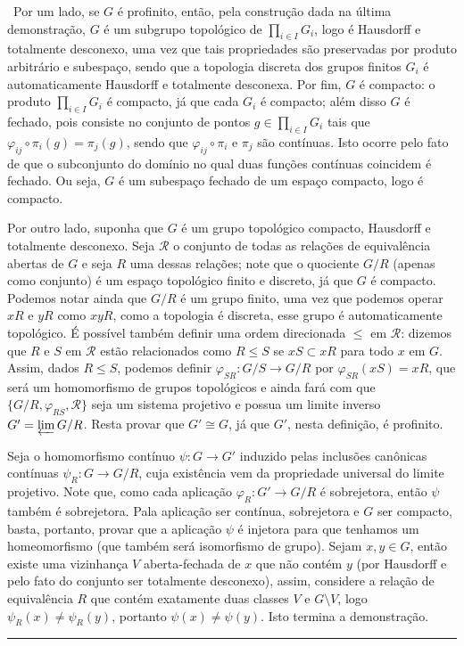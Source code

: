\documentclass[12pt,a4paper]{article}
\def\dem{\par\smallbreak\noindent {\textit{ Demonstração:}} \ }
\def\eop{\hfill\rule{2.5mm}{2.5mm} \\ }
\theoremstyle{definition}
\begin{document}
\dem Por um lado, se $G$ é profinito, então, pela construção dada na última demonstração, $G$ é um subgrupo topológico de $\prod_{i\in I} G_i$, logo é Hausdorff e totalmente desconexo, uma vez que tais propriedades são preservadas por produto arbitrário e subespaço, sendo que a topologia discreta dos grupos finitos $G_i$ é automaticamente Hausdorff e totalmente desconexa. Por fim, $G$ é compacto: o produto $\prod_{i\in I} G_i$ é compacto, já que cada $G_i$ é compacto; além disso $G$ é fechado, pois consiste no conjunto de pontos $g\in \prod_{i\in I} G_i$ tais que $\varphi_{ij}\circ\pi_{i}(g)=\pi_{j}(g)$, sendo que $\varphi_{ij}\circ\pi_{i}$ e $\pi_{j}$ são contínuas. Isto ocorre pelo fato de que o subconjunto do domínio no qual duas funções contínuas coincidem é fechado. Ou seja, $G$ é um subespaço fechado de um espaço compacto, logo é compacto. 

Por outro lado, suponha que $G$ é um grupo topológico compacto, Hausdorff e totalmente desconexo. Seja $\mathscr{R}$ o conjunto de todas as relações de equivalência abertas de $G$ e seja $R$ uma dessas relações; note que o quociente $G/R$ (apenas como conjunto) é um espaço topológico finito e discreto, já que $G$ é compacto. Podemos notar ainda que $G/R$ é um grupo finito, uma vez que podemos operar $xR$ e $yR$ como $xyR$, como a topologia é discreta, esse grupo é automaticamente topológico. É possível também definir uma ordem direcionada $\leq$ em $\mathscr{R}$: dizemos que $R$ e $S$ em $\mathscr{R}$ estão relacionados como $R\leq S$ se $xS\subset xR$ para todo $x$ em $G$. Assim, dados $R\leq S$, podemos definir  $\varphi_{SR}: G/S \rightarrow G/R$ por $\varphi_{SR}(xS)=xR$, que será um homomorfismo de grupos topológicos e ainda fará com que $\{ G/R, \varphi_{RS} , \mathscr{R} \}$ seja um sistema projetivo e possua um limite inverso $G'= \varprojlim G/R$. Resta provar que $G'\cong G$, já que $G'$, nesta definição, é profinito.

Seja o homomorfismo contínuo $\psi: G\rightarrow G'$ induzido pelas inclusões canônicas contínuas $\psi_R:G\rightarrow G/R$, cuja existência vem da propriedade universal do limite projetivo. Note que, como cada aplicação $\varphi_{R}:G'\rightarrow G/R$ é sobrejetora, então $\psi$ também é sobrejetora. Pala aplicação ser contínua, sobrejetora e $G$ ser compacto, basta, portanto, provar que a aplicação $\psi$ é injetora para que tenhamos um homeomorfismo (que também será isomorfismo de grupo). Sejam $x,y\in G$, então existe uma vizinhança $V$ aberta-fechada de $x$ que não contém $y$ (por Hausdorff e pelo fato do conjunto ser totalmente desconexo), assim, considere a relação de equivalência $R$ que contém exatamente duas classes $V$ e $G\setminus V$, logo $\psi_R(x)\neq \psi_R(y)$, portanto $\psi(x)\neq\psi(y)$. Isto termina a demonstração. \eop 
\end{document}
